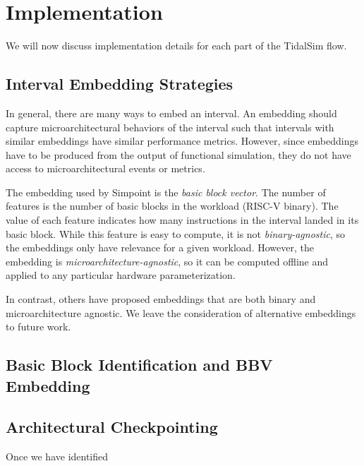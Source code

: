 \documentclass[sigplan,nonacm,10pt]{acmart}
\begin{document}
\section{Implementation}

We will now discuss implementation details for each part of the TidalSim flow.

\subsection{Interval Embedding Strategies}

In general, there are many ways to embed an interval.
An embedding should capture microarchitectural behaviors of the interval such that intervals with similar embeddings have similar performance metrics.
However, since embeddings have to be produced from the output of functional simulation, they do not have access to microarchitectural events or metrics.

The embedding used by Simpoint is the \textit{basic block vector}.
The number of features is the number of basic blocks in the workload (RISC-V binary).
The value of each feature indicates how many instructions in the interval landed in its basic block.
While this feature is easy to compute, it is not \textit{binary-agnostic}, so the embeddings only have relevance for a given workload.
However, the embedding is \textit{microarchitecture-agnostic}, so it can be computed offline and applied to any particular hardware parameterization.

In contrast, others have proposed embeddings that are both binary and microarchitecture agnostic\cite{nps}.
We leave the consideration of alternative embeddings to future work.


\subsection{Basic Block Identification and BBV Embedding}

\subsection{Architectural Checkpointing}

Once we have identified
\end{document}
